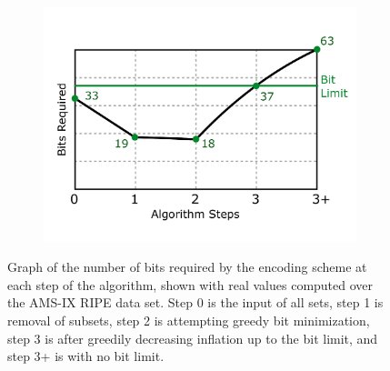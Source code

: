 \begin{figure}[t!] 
\begin{minipage}{1\linewidth}
\begin{subfigure}[b]{\linewidth}
\includegraphics[width=\linewidth]{figures/bit_graph}
\end{subfigure} 
\end{minipage} 
\caption{Graph of the number of bits required by the encoding scheme at each step of the algorithm, shown with real values computed over the AMS-IX RIPE data set. Step 0 is the input of all sets, step 1 is removal of subsets, step 2 is attempting greedy bit minimization, step 3 is after greedily decreasing inflation up to the bit limit, and step 3+ is with no bit limit. }
\label{fig:bit_graph}
\end{figure}
